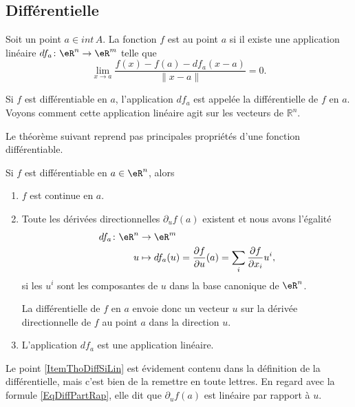                     \subsection{Différentielle}

\begin{definition}      \label{DefDifferentiablFnRn}
Soit un point $a \in int\,A$. La fonction $f$ est  au point $a$ si il existe une application linéaire $df_a\colon \eR^n\to \eR^m$ telle que 
\begin{equation}        \label{EqDefDiffableT}
    \lim_{x\to a} \frac{f(x) - f(a) - df_a (x-a)}{\|x-a\|}=0.
\end{equation}
\end{definition}

Si $f$ est différentiable en $a$, l'application $df_a$ est appelée la différentielle de $f$ en $a$. Voyons comment cette application linéaire agit sur les vecteurs de $\mathbb{R}^n$.

Le théorème suivant reprend pas principales propriétés d'une fonction différentiable.
\begin{theorem}     \label{ThoRapPropDiffSi}
Si $f$ est différentiable en $a\in\eR^n$, alors
\begin{enumerate}
\item $f$ est continue en $a$.

\item  Toute les dérivées directionnelles $\partial_uf(a)$ existent et nous avons l'égalité
\begin{equation}        \label{EqDiffPartRap}
    \begin{aligned}
        df_a\colon \eR^n&\to \eR^m \\
        u&\mapsto df_a(u)=\frac{ \partial f }{ \partial u }(a)=\sum_i \frac{ \partial f }{ \partial x_i }u^i,
    \end{aligned}
\end{equation}
si les $u^i$ sont les composantes de $u$ dans la base canonique de $\eR^n$.

La différentielle de $f$ en $a$ envoie donc un vecteur $u$ sur la dérivée directionnelle de $f$ au point $a$ dans la direction $u$. 

\item\label{ItemThoDiffSiLin} L'application $df_a$ est une application linéaire.
\end{enumerate}
\end{theorem}
Le point \ref{ItemThoDiffSiLin} est évidement contenu dans la définition de la différentielle, mais c'est bien de la remettre en toute lettres. En regard avec la formule \eqref{EqDiffPartRap}, elle dit que $\partial_uf(a)$ est linéaire par rapport à $u$.


